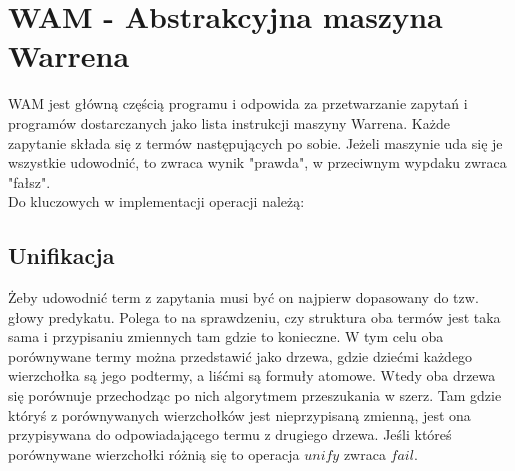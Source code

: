 \chapter{WAM - Abstrakcyjna maszyna Warrena}
\thispagestyle{chapterBeginStyle}

\iffalse
W tym rozdziale należy przedstawić analizę zagadnienia, które podlega informatyzacji. Należy zidentyfikować i opisać obiekty składowe rozważanego wycinka rzeczywistości i ich wzajemne relacje (np.\ użytkowników systemu i ich role). Należy szczegółowo omówić procesy jakie zachodzą w systemie i które będą informatyzowane, takie jak np.\ przepływ dokumentów.
Należy sprecyzować i wypunktować założenia funkcjonalne i poza funkcjonalne dla projektowanego systemu.
Jeśli istnieją aplikacje realizujące dowolny podzbiór zadanych funkcjonalności realizowanego systemu należy przeprowadzić ich analizę porównawczą, wskazując na różnice bądź innowacyjne elementy, które projektowany w pracy system informatyczny będzie zawierał.
Należy odnieść się do uwarunkowań prawnych związanych z procesami przetwarzania danych w projektowanym systemie.
Jeśli zachodzi konieczność, należy wprowadzić i omówić model matematyczny elementów systemu na odpowiednim poziomie abstrakcji.

{\color{dgray}
W niniejszym rozdziale omówiono koncepcję architektury programowej systemu \ldots. W
szczególny sposób \ldots. Omówiono założenia funkcjonalne i niefunkcjonalne podsystemów \ldots. Przedstawiono
mechanizmy \ldots. Sklasyfikowano systemy ze względu na \ldots. Omówiono istniejące rozwiązania informatyczne o podobnej funkcjonalności \ldots (zobacz \cite{JCINodesChord}).
}
\fi

WAM jest główną częścią programu i odpowida za przetwarzanie zapytań i programów dostarczanych jako lista instrukcji maszyny Warrena. Każde zapytanie składa się z termów następujących po sobie. Jeżeli maszynie uda się je wszystkie udowodnić, to zwraca wynik "prawda", w przeciwnym wypdaku zwraca "fałsz".\\
Do kluczowych w implementacji operacji należą:\\

\section{Unifikacja}

Żeby udowodnić term z zapytania musi być on najpierw dopasowany do tzw. głowy predykatu. Polega to na sprawdzeniu, czy struktura oba termów jest taka sama i przypisaniu zmiennych tam gdzie to konieczne. W tym celu oba porównywane termy można przedstawić jako drzewa, gdzie dziećmi każdego wierzchołka są jego podtermy, a liśćmi są formuły atomowe. Wtedy oba drzewa się porównuje przechodząc po nich algorytmem przeszukania w szerz. Tam gdzie któryś z porównywanych wierzchołków jest nieprzypisaną zmienną, jest ona przypisywana do odpowiadającego termu z drugiego drzewa. Jeśli któreś porównywane wierzchołki różnią się to operacja $unify$ zwraca $fail$.

